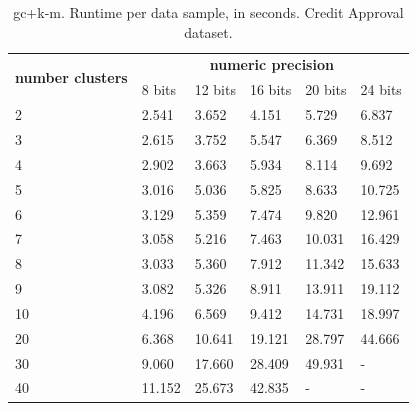 \begin{table}[htp]
\centering
\caption{\acs{gc}+\acs{k-m}. Runtime per data sample, in seconds. Credit Approval dataset.}
\label{table:runtimeKMCA}
\begin{tabular}{|l|l|l|l|l|l|}
\hline
\multirow{2}{*}{\textbf{number clusters}} & \multicolumn{5}{c|}{\textbf{numeric precision}}                                              \\ \cline{2-6}
                                          & 8 bits & 12 bits & 16 bits & 20 bits & 24 bits \\ \hline
2                                & 2.541           & 3.652            & 4.151            & 5.729            & 6.837            \\ \hline
3                                & 2.615           & 3.752            & 5.547            & 6.369            & 8.512            \\ \hline
4                                & 2.902           & 3.663            & 5.934            & 8.114            & 9.692            \\ \hline
5                                & 3.016           & 5.036            & 5.825            & 8.633            & 10.725           \\ \hline
6                                & 3.129           & 5.359            & 7.474            & 9.820            & 12.961           \\ \hline
7                                & 3.058           & 5.216            & 7.463            & 10.031           & 16.429           \\ \hline
8                                & 3.033           & 5.360            & 7.912            & 11.342           & 15.633           \\ \hline
9                                & 3.082           & 5.326            & 8.911            & 13.911           & 19.112           \\ \hline
10                               & 4.196           & 6.569            & 9.412            & 14.731           & 18.997           \\ \hline
20                               & 6.368           & 10.641           & 19.121           & 28.797           & 44.666           \\ \hline
30                               & 9.060           & 17.660           & 28.409           & 49.931           & -                \\ \hline
40                               & 11.152          & 25.673           & 42.835           & -                & -                \\ \hline

\end{tabular}
\end{table}
